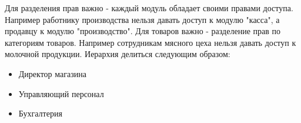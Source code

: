 \documentclass[DIV=calc, paper=a4, fontsize=11pt]{scrartcl} %
\begin{document}
Для разделения прав важно - каждый модуль обладает своими правами доступа. Например работнику производства нельзя давать доступ к модулю "касса", а продавцу к модулю "производство".
Для товаров важно - разделение прав по категориям товаров. Например сотрудникам мясного цеха нельзя давать доступ к молочной продукции.
Иерархия делиться следующим образом:

\begin{itemize}
	\item Директор магазина
	\item Управляющий персонал
	\item Бухгалтерия
\end{itemize}
\end{document}
